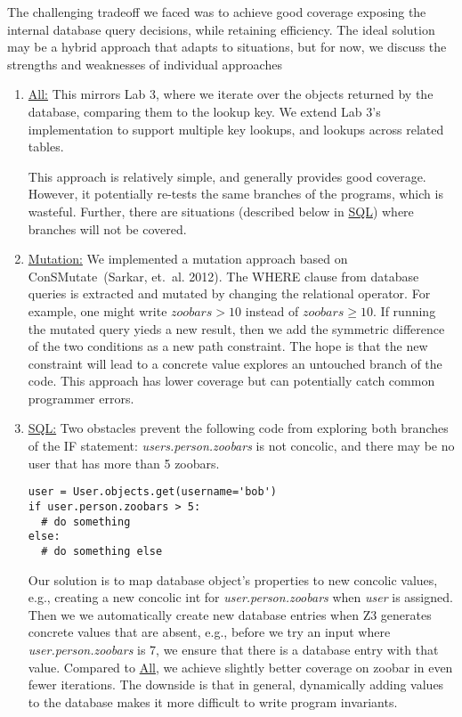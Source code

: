 \documentclass{scrartcl}
\begin{document}
The challenging tradeoff we faced was to achieve good coverage
exposing the internal database query decisions, while retaining
efficiency. The ideal solution may be a hybrid approach that adapts to
situations, but for now, we discuss the strengths and weaknesses of
individual approaches

\begin{enumerate}
\item \underline{All:}
  This mirrors Lab 3, where we iterate over the objects returned by
  the database, comparing them to the lookup key. We extend Lab 3's
  implementation to support multiple key lookups, and lookups across
  related tables.

  This approach is relatively simple, and generally provides good
  coverage. However, it potentially re-tests the same branches of the programs, which is wasteful. Further, there are situations (described
  below in \underline{SQL}) where branches will not be covered.

\item \underline{Mutation:}
  We implemented a mutation approach based on ConSMutate~(Sarkar,
  et.\ al. 2012). The WHERE clause from database queries is extracted
  and mutated by changing the relational operator. For example, one
  might write $\textit{zoobars} > 10$ instead of $\textit{zoobars}
  \geq 10$. If running the mutated query yieds a new result, then we
  add the symmetric difference of the two conditions as a new path
  constraint. The hope is that the new constraint will lead to a
  concrete value explores an untouched branch of the code. This
  approach has lower coverage but can potentially catch common
  programmer errors.

\item \underline{SQL:}
  Two obstacles prevent the following code from exploring both
  branches of the IF statement: \textit{users.person.zoobars} is not
  concolic, and there may be no user that has more than 5 zoobars.
  \begin{verbatim}user = User.objects.get(username='bob')
if user.person.zoobars > 5:
  # do something
else:
  # do something else\end{verbatim}
  Our solution is to map database object's properties to new concolic
  values, e.g., creating a new concolic int for
  \textit{user.person.zoobars} when \textit{user} is assigned. Then we
  we automatically create new database entries when Z3 generates
  concrete values that are absent, e.g., before we try an input where
  \textit{user.person.zoobars} is 7, we ensure that there is a
  database entry with that value. Compared to \underline{All}, we
  achieve slightly better coverage on zoobar in even fewer iterations.
  The downside is that in general, dynamically adding values to the
  database makes it more difficult to write program invariants.
\end{enumerate}
\end{document}

